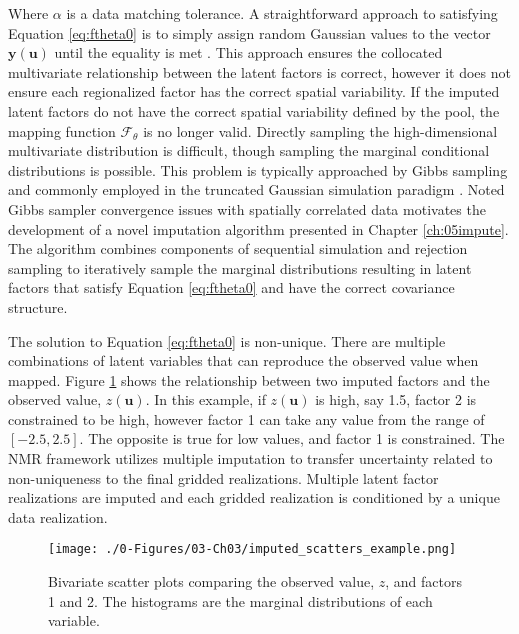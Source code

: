 Where $\alpha$ is a data matching tolerance. A straightforward approach to satisfying Equation \ref{eq:ftheta0} is to simply assign random Gaussian values to the vector $\mathbf{y}(\mathbf{u})$ until the equality is met \citep{silva2018enhanced}. This approach ensures the collocated multivariate relationship between the latent factors is correct, however it does not ensure each regionalized factor has the correct spatial variability. If the imputed latent factors do not have the correct spatial variability defined by the pool, the mapping function $\mathcal{F}_{\theta}$ is no longer valid. Directly sampling the high-dimensional multivariate distribution is difficult, though sampling the marginal conditional distributions is possible. This problem is typically approached by Gibbs sampling \citep{geman1984stochastic} and commonly employed in the truncated Gaussian simulation paradigm \citep{arroyo2020iterative,madani2021enhanced}. Noted Gibbs sampler convergence issues with spatially correlated data motivates the development of a novel imputation algorithm presented in Chapter \ref{ch:05impute}. The algorithm combines components of sequential simulation and rejection sampling to iteratively sample the marginal distributions resulting in latent factors that satisfy Equation \ref{eq:ftheta0} and have the correct covariance structure.

The solution to Equation \ref{eq:ftheta0} is non-unique. There are multiple combinations of latent variables that can reproduce the observed value when mapped. Figure \ref{fig:imputed_scatters_example} shows the relationship between two imputed factors and the observed value, $z(\mathbf{u})$. In this example, if $z(\mathbf{u})$ is high, say 1.5, factor 2 is constrained to be high, however factor 1 can take any value from the range of $[-2.5, 2.5]$. The opposite is true for low values, and factor 1 is constrained. The \gls{NMR} framework utilizes multiple imputation to transfer uncertainty related to non-uniqueness to the final gridded realizations. Multiple latent factor realizations are imputed and each gridded realization is conditioned by a unique data realization.

\begin{figure}[htb!]
    \centering
    \texttt{[image: ./0-Figures/03-Ch03/imputed\_scatters\_example.png]}
    \caption{Bivariate scatter plots comparing the observed value, $z$, and factors 1 and 2. The histograms are the marginal distributions of each variable. }
    \label{fig:imputed_scatters_example}
\end{figure}

